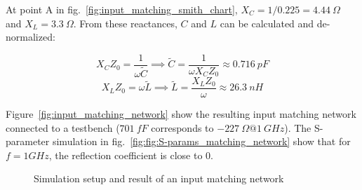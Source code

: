 \documentclass[report.tex]{subfiles}
\begin{document}
At point A in fig.~\ref{fig:input_matching_smith_chart}, $X_C=1/0.225=4.44~\Omega$ and $X_L=3.3~\Omega$. From these reactances, $C$ and $L$ can be calculated and de-normalized:

\begin{equation*}
    X_C Z_0 = \frac{1}{\omega \tilde{C}} \implies
    \tilde{C} = \frac{1}{\omega X_C Z_0} \approx 0.716 ~pF
\end{equation*}
\begin{equation*}
    X_L Z_0=\omega \tilde{L} \implies 
    \tilde{L}=\frac{X_L Z_0}{\omega} \approx 26.3~nH
\end{equation*}

Figure~\ref{fig:input_matching_network} show the resulting input matching network connected to a testbench ($701~fF$ corresponds to $-227~\Omega@1~GHz$). The S-parameter simulation in fig.~\ref{fig:fig:S-params_matching_network} show that for $f=1GHz$, the reflection coefficient is close to 0.

\begin{figure}
    \centering
    
    \caption{Simulation setup and result of an input matching network}
\end{figure}

\clearpage %
\end{document}
